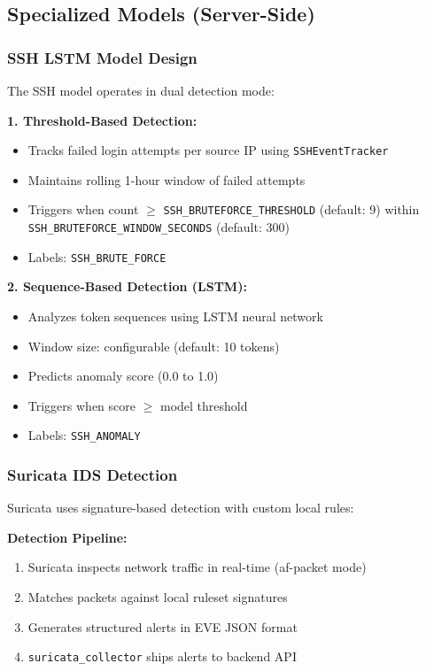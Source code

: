 \documentclass[12pt,a4paper]{report} %
\begin{document}
\subsection{Specialized Models (Server-Side)}

\subsubsection{SSH LSTM Model Design}
The SSH model operates in dual detection mode:

\textbf{1. Threshold-Based Detection:}
\begin{itemize}
	\item Tracks failed login attempts per source IP using \texttt{SSHEventTracker}
	\item Maintains rolling 1-hour window of failed attempts
	\item Triggers when count $\geq$ \texttt{SSH\_BRUTEFORCE\_THRESHOLD} (default: 9) within \texttt{SSH\_BRUTEFORCE\_WINDOW\_SECONDS} (default: 300)
	\item Labels: \texttt{SSH\_BRUTE\_FORCE}
\end{itemize}

\textbf{2. Sequence-Based Detection (LSTM):}
\begin{itemize}
	\item Analyzes token sequences using LSTM neural network
	\item Window size: configurable (default: 10 tokens)
	\item Predicts anomaly score (0.0 to 1.0)
	\item Triggers when score $\geq$ model threshold
	\item Labels: \texttt{SSH\_ANOMALY}
\end{itemize}

\subsubsection{Suricata IDS Detection}
Suricata uses signature-based detection with custom local rules:

\textbf{Detection Pipeline:}
\begin{enumerate}
	\item Suricata inspects network traffic in real-time (af-packet mode)
	\item Matches packets against local ruleset signatures
	\item Generates structured alerts in EVE JSON format
	\item \texttt{suricata\_collector} ships alerts to backend API
\end{enumerate}
\end{document}
